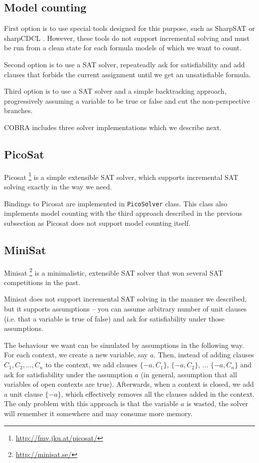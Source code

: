 \subsection{Model counting}

First option is to use special tools designed for this purpose,
  such as SharpSAT or sharpCDCL .
However, these tools do not support incremental solving and
  must be run from a clean state for each formula models of which we want to count.

Second option is to use a SAT solver, repeateadly ask for satisfiability and
  add clauses that forbids the current assignment until we get
  an unsatisfiable formula.

Third option is to use a SAT solver and a simple backtracking approach,
  progressively assuming a variable to be true or false and cut the non-perspective
  branches.


COBRA includes three solver implementations which we describe next.

\subsection{PicoSat}
Picosat \footnote{\url{http://fmv.jku.at/picosat/}}\cite{picosat} is a simple
  extensible SAT solver, which supports incremental SAT solving exactly in the way
  we need.

Bindings to Picosat are implemented in \texttt{PicoSolver} class.
This class also implements model counting with the third approach described in
the previous subsection as Picosat does not support model counting itself.

\subsection{MiniSat}

Minisat \footnote{\url{http://minisat.se/}}\cite{minisat} is a minimalistic,
  extensible SAT solver that won several SAT competitions in the past.

Minisat does not support incremental SAT solving in the manner we described,
  but it supports assumptions -- you can assume arbitrary number of unit clauses
  (i.e. that a variable is true of false) and ask for satisfiability under
  those assumptions.

The behaviour we want can be simulated by assumptions in the following way.
For each context, we create a new variable, say $a$.
Then, instead of adding clauses $C_1, C_2, ..., C_n$ to the context,
  we add clauses $\{-a, C_1\}$, $\{-a, C_2\}$, ... $\{-a, C_n\}$ and ask
  for satisfiability under the assumption $a$ (in general,
  assumption that all variables of open contexts are true).
Afterwards, when a context is closed, we add a unit clause $\{-a\}$,
  which effectively removes all the clauses added in the context.
The only problem with this approach is that the variable $a$ is wasted,
  the solver will remember it somewhere and may consume more memory.

